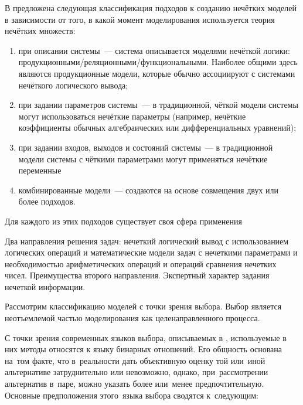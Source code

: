В \cite{Borisov_Fedulov} предложена следующая классификация подходов к созданию нечётких моделей в зависимости от того, в какой момент моделирования используется теория нечётких множеств:
\begin{enumerate}
	\item при описании системы~--- система описывается моделями нечёткой логики: продукционными/реляционными/функциональными. Наиболее общими здесь являются продукционные модели, которые обычно ассоциируют с системами нечёткого логического вывода;
	\item при задании параметров системы~--- в традиционной, чёткой модели системы могут использоваться нечёткие параметры (например, нечёткие коэффициенты обычных алгебраических или дифференциальных уравнений);
	\item при задании входов, выходов и состояний системы~--- в традиционной модели системы с чёткими параметрами могут применяться нечёткие переменные
	\item комбинированные модели~--- создаются на основе совмещения двух или более подходов.
\end{enumerate}

Для каждого из этих подходов существует своя сфера применения

Два направления решения задач: нечеткий логический вывод с использованием логических операций и математические модели задач с нечеткими параметрами и необходимостью арифметических операций и операций сравнения нечетких чисел. Преимущества второго направления. Экспертный характер задания нечеткой информации.


Рассмотрим классификацию моделей с точки зрения выбора. Выбор является неотъемлемой частью моделирования как целенаправленного процесса.


С точки зрения современных языков выбора, описываемых в \cite{Choice_Languages}, используемые в них методы относятся к языку бинарных отношений. Его общность основана на~том факте, что в~реальности дать объективную оценку той или~иной альтернативе затруднительно или невозможно, однако, при~рассмотрении альтернатив в~паре, можно указать более или~менее предпочтительную. Основные предположения этого~языка выбора сводятся к~следующим:

